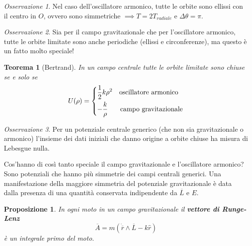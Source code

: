 \documentclass{book}
\theoremstyle{plain}
\newtheorem{teo}{Teorema}[chapter]
\theoremstyle{plain}
\theoremstyle{plain}
\theoremstyle{plain}
\theoremstyle{plain}
\newtheorem{prop}{Proposizione}[chapter]
\theoremstyle{definition}
\theoremstyle{remark}
\newtheorem*{oss}{Osservazione}
\theoremstyle{definition}
\begin{document}
\begin{oss}
    Nel caso dell'oscillatore armonico, tutte le orbite sono ellissi con il centro in $O$, ovvero sono simmetriche $\implies T=2T_{radiale}$ e $\Delta\theta=\pi$.
\end{oss}

\begin{oss}
    Sia per il campo gravitazionale che per l'oscillatore armonico, tutte le orbite limitate sono anche periodiche (ellissi e circonferenze), ma questo è un fatto molto speciale!
\end{oss}

\begin{teo}[Bertrand]
    In un campo centrale tutte le orbite limitate sono chiuse se e solo se
    \begin{displaymath}
        U(\rho)=
        \begin{dcases}
        \frac{1}{2}k\rho^2 \quad \text{oscillatore armonico} \\
        -\frac{k}{\rho} \quad \; \; \; \text{campo gravitazionale}
    \end{dcases}
    \end{displaymath}
\end{teo}

\begin{oss}
     Per un potenziale centrale generico (che non sia gravitazionale o armonico) l'insieme dei dati iniziali che danno origine a orbite chiuse ha misura di Lebesgue nulla.
\end{oss}

\noindent Cos'hanno di così tanto speciale il campo gravitazionale e l'oscillatore armonico? Sono potenziali che hanno più simmetrie dei campi centrali generici. Una manifestazione della maggiore simmetria del potenziale gravitazionale è data dalla presenza di una quantità conservata indipendente da $\overline{L}$ e $E$.

\begin{prop}
     In ogni moto in un campo gravitazionale il \textbf{vettore di Runge-Lenz}
     \begin{displaymath}
     \boxed{
         \overline{A}= m\left(\dot{\overline{r}}\wedge\overline{L}-k\hat{r}\right)
         }
     \end{displaymath}
     è un integrale primo del moto.
\end{prop}
\end{document}
